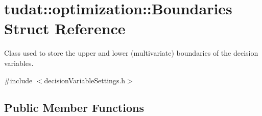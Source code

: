 \hypertarget{structtudat_1_1optimization_1_1Boundaries}{}\section{tudat\+:\+:optimization\+:\+:Boundaries Struct Reference}
\label{structtudat_1_1optimization_1_1Boundaries}


Class used to store the upper and lower (multivariate) boundaries of the decision variables.  




{\ttfamily \#include $<$decision\+Variable\+Settings.\+h$>$}

\subsection*{Public Member Functions}
